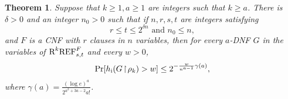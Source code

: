 \documentclass[10pt,a4paper]{article}
\newtheorem{theorem}{Theorem}
\theoremstyle{remark}
\newtheorem*{switching lemma}{Switching Lemma}
\newtheorem*{open problem}{Open Problem}
\theoremstyle{definition}
\begin{document}
\begin{theorem}
\label{thm:switching_a-DNFs_to_trees}
Suppose that $k \geq 1,a \geq 1$ are integers such that $k \geq a$. There is $\delta > 0$ and an integer $n_0 > 0$ such that if $n,r,s,t$ are integers satisfying 
\begin{equation}
\label{eq:conditions_n,r,t_in_switching_theorem} 
r \leq t \leq 2^{\delta n} \text{ and } n_0 \leq n,
\end{equation} 
and $F$ is a CNF with $r$ clauses in $n$ variables, then for every $a$-DNF $G$ in the variables of $\textnormal{R}^k\textnormal{REF}^{F}_{s,t}$ and every $w>0$, 
\begin{equation}
\label{eqn:probability_p_a_w}
\Pr[h_{\textnormal{i}}(G \! \restriction \! \rho_k) > w] \leq 2^{- \frac{w}{n^{a-1}} \gamma(a)},
\end{equation}
where $\gamma(a) = \frac{(\log e)^a}{2^{a^2 + 3a -2} a!}$.
\end{theorem}
\end{document}
